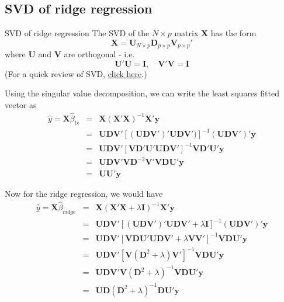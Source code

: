 \documentclass{beamer}
\newcommand{\X}{\bm{X}}
\newcommand{\y}{\bm{y}}
\begin{document}
\subsection{SVD of ridge regression}
\begin{frame}{SVD of ridge regression}
The SVD of the $N\times p$ matrix $\X$ has the form
\[
\X=\bm{U}_{N\times p}\bm{D}_{p\times p}\bm{V}_{p\times p}'
\]
where $\bm{U}$ and $\bm{V}$ are orthogonal - i.e. 
\[
\bm{U}'\bm{U}=\bm{I},\quad \bm{V}'\bm{V}=\bm{I}
\]
(For a quick review of SVD, \href{https://mathworld.wolfram.com/SingularValueDecomposition.html}{click here}.)

Using the singular value decomposition, we can write the least squares fitted vector as 
\begin{eqnarray*}
\hat{y}=\X\hat{\beta}_{ls}&=&\X(\X'\X)^{-1}\X'\y\\
&=&\bm{UDV}'[(\bm{UDV}')'\bm{UDV}')]^{-1}(\bm{UDV}')'\y\\
&=&\bm{UDV}'[\bm{V}\bm{D}'\bm{U}'\bm{UDV}']^{-1}\bm{V}\bm{D}'\bm{U}'\y\\
&=&\bm{UDV}'\bm{V}\bm{D}^{-2}\bm{V}'\bm{V}\bm{D}\bm{U'}\y\\
&=&\bm{UU}'\y
\end{eqnarray*}
\end{frame}

\begin{frame}
Now for the ridge regression, we would have
\begin{eqnarray*}
\hat{y}=\X\hat{\beta}_{ridge}&=&\X(\X'\X+\lambda\bm{I})^{-1}\X'\y\\
&=&\bm{UDV}'[(\bm{UDV}')'\bm{UDV}'+\lambda\bm{I}]^{-1}(\bm{UDV}')'\y\\
&=&\bm{UDV}'[\bm{V}\bm{D}\bm{U}'\bm{UDV}'+\lambda\bm{V}\bm{V}']^{-1}\bm{V}\bm{D}\bm{U}'\y\\
&=&\bm{UDV}'[\bm{V}(\bm{D}^2+\lambda)\bm{V}']^{-1}\bm{VDU}'\y\\
&=&\bm{UDV}'\bm{V}(\bm{D}^2+\lambda)^{-1}\bm{VDU}'\y\\
&=&\bm{UD}(\bm{D}^2+\lambda)^{-1}\bm{DU}'\y
\end{eqnarray*}
\end{frame}
%
%
\end{document}
